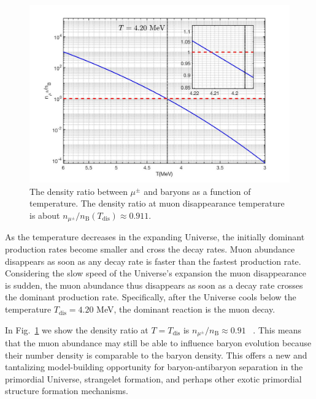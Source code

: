 \documentclass[universe,article,submit,moreauthors,pdftex,a4paper]{Definitions/mdpi}
\newcommand*{\rf}[1]{Fig.~{\ref{#1}}}
\begin{document}
\begin{figure}[t]
\centering
\includegraphics[width=0.9\columnwidth]{./plots/DensityRatio_new2.jpg}
\caption{The density ratio between $\mu^\pm$ and baryons as a function of temperature. The density ratio at muon disappearance temperature is about $n_{\mu^\pm}/n_\mathrm{B}(T_\mathrm{dis})\approx0.911$.}
\label{muonRatio_fig} 
\end{figure}
As the temperature decreases in the expanding Universe, the initially dominant production rates become smaller and cross the decay rates. Muon abundance disappears as soon as any decay rate is faster than the fastest production rate. Considering the slow speed of the Universe's expansion the muon disappearance is sudden, the muon abundance thus disappears as soon as a decay rate crosses the dominant production rate. Specifically, after the Universe cools below the temperature $T_\mathrm{dis} = 4.20$ MeV, the dominant reaction is the muon decay.

In \rf{muonRatio_fig} we show the density ratio at $T=T_\mathrm{dis}$ is $n_{\mu^\pm}/n_\mathrm{B}\approx0.91$~\cite{Yang:2021bko} . This means that the muon abundance may still be able to influence baryon evolution because their number density is comparable to the baryon density. This offers a new and tantalizing model-building opportunity for baryon-antibaryon separation in the primordial Universe, strangelet formation, and perhaps other exotic primordial structure formation mechanisms.

\end{document}
